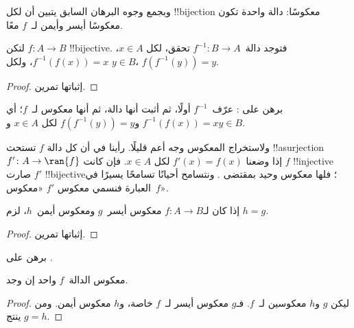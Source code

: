 \documentclass[../../../include/open-logic-section]{subfiles}
\begin{document}
\begin{explain}
وبجمع وجوه البرهان السابق يتبين أن لكل !!{bijection} معكوسًا:
دالة واحدة تكون معكوسًا أيسر وأيمن لـ~$f$ معًا.
\end{explain}

\begin{prop}
لتكن $f\colon A \to B$ !!{bijective}. فتوجد
دالة~$f^{-1}\colon B \to A$ تحقق، لكل $x \in A$،
$f^{-1}(f(x)) = x$، ولكل $y \in B$، $f(f^{-1}(y)) = y$.
\end{prop}

\begin{proof}
إثباتها تمرين.
\end{proof}

\begin{prob}
برهن على : عرّف~$f^{-1}$
أولًا، ثم أثبت أنها دالة، ثم أنها معكوس لـ~$f$؛ أي
$f^{-1}(f(x)) = x$ و$f(f^{-1}(y)) = y$ لكل $x \in A$ و$y \in B$.
\end{prob}

\begin{explain}
ولاستخراج المعكوس وجه أعم قليلًا. رأينا في  أن كل
دالة $f$ تستحث !!a{surjection} $f' \colon A \to \ran{f}$ إذا وضعنا
$f'(x) = f(x)$ لكل $x \in A$. فإن كانت $f$ !!{injective} صارت
$f'$ !!{bijective}؛ فلها معكوس وحيد بمقتضى .
ونتسامح أحيانًا تسامحًا يسيرًا في العبارة فنسمي معكوس $f'$
«معكوس~$f$».
\end{explain}

\begin{prop}%
إذا كان لـ$f\colon A \to B$ معكوس أيسر~$g$ ومعكوس أيمن~$h$، لزم $h = g$.
\end{prop}

\begin{proof}
إثباتها تمرين.
\end{proof}

\begin{prob}
برهن على .
\end{prob}

\begin{prop}
معكوس الدالة~$f$ واحد إن وجد.
\end{prop}

\begin{proof}
ليكن $g$ و$h$ معكوسين لـ~$f$. فـ$g$ معكوس أيسر لـ~$f$ خاصة،
و$h$ معكوس أيمن. ومن  ينتج $g = h$.
\end{proof}
\end{document}
